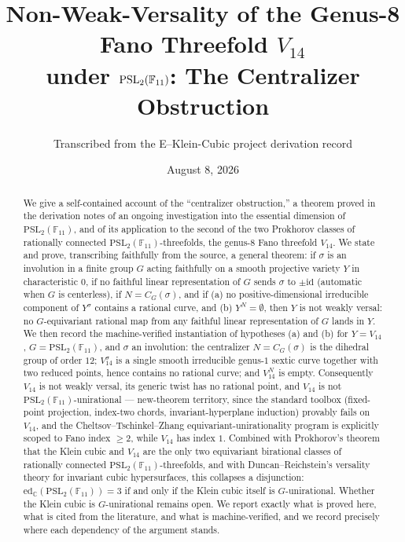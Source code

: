 \documentclass[11pt]{article}
\title{Non-Weak-Versality of the Genus-8 Fano Threefold $V_{14}$\\
under $\PSL$: The Centralizer Obstruction}
\author{Transcribed from the E--Klein-Cubic project derivation record}
\date{August 8, 2026}
\theoremstyle{plain}
\theoremstyle{definition}
\theoremstyle{remark}
\newcommand{\PSL}{\mathrm{PSL}_2(\mathbb{F}_{11})}
\newcommand{\edC}{\mathrm{ed}_{\mathbb C}}
\begin{document}
\maketitle

\begin{abstract}
We give a self-contained account of the ``centralizer obstruction,'' a
theorem proved in the derivation notes of an ongoing investigation into
the essential dimension of $\PSL$, and of its application to the second
of the two Prokhorov classes of rationally connected $\PSL$-threefolds,
the genus-$8$ Fano threefold $V_{14}$. We state and prove, transcribing
faithfully from the source, a general theorem: if $\sigma$ is an
involution in a finite group $G$ acting faithfully on a smooth projective
variety $Y$ in characteristic $0$, if no faithful linear representation
of $G$ sends $\sigma$ to $\pm\mathrm{id}$ (automatic when $G$ is
centerless), if $N=C_G(\sigma)$, and if (a) no positive-dimensional
irreducible component of $Y^\sigma$ contains a rational curve, and (b)
$Y^N=\emptyset$, then $Y$ is not weakly versal: no $G$-equivariant
rational map from any faithful linear representation of $G$ lands in
$Y$. We then record the machine-verified instantiation of hypotheses
(a) and (b) for $Y=V_{14}$, $G=\PSL$, and $\sigma$ an involution: the
centralizer $N=C_G(\sigma)$ is the dihedral group of order $12$;
$V_{14}^\sigma$ is a single smooth irreducible genus-$1$ sextic curve
together with two reduced points, hence contains no rational curve; and
$V_{14}^{N}$ is empty. Consequently $V_{14}$ is not weakly versal, its
generic twist has no rational point, and $V_{14}$ is not
$\PSL$-unirational --- new-theorem territory, since the standard toolbox
(fixed-point projection, index-two chords, invariant-hyperplane
induction) provably fails on $V_{14}$, and the Cheltsov--Tschinkel--Zhang
equivariant-unirationality program is explicitly scoped to Fano index
$\ge 2$, while $V_{14}$ has index $1$. Combined with Prokhorov's theorem
that the Klein cubic and $V_{14}$ are the only two equivariant
birational classes of rationally connected $\PSL$-threefolds, and with
Duncan--Reichstein's versality theory for invariant cubic hypersurfaces,
this collapses a disjunction: $\edC(\PSL)=3$ if and only if the Klein
cubic itself is $G$-unirational. Whether the Klein cubic is
$G$-unirational remains open. We report exactly what is proved here,
what is cited from the literature, and what is machine-verified, and we
record precisely where each dependency of the argument stands.
\end{abstract}
\end{document}
